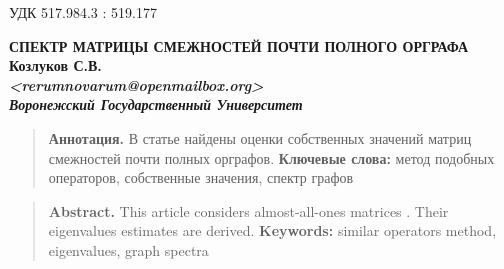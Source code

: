 \documentclass{article}
\begin{document}
\setcounter{thm}{0}
\quad УДК 517.984.3 : 519.177

\begin{center}
\vskip0.5cm
\textbf{СПЕКТР МАТРИЦЫ СМЕЖНОСТЕЙ ПОЧТИ ПОЛНОГО ОРГРАФА}\\
\vskip0.5cm
\textbf{
    \textbf{Козлуков С.В.\footnotemark} \\
    \textit{<rerumnovarum@openmailbox.org>} \\
    \textit{Воронежский Государственный Университет}
}
\end{center}


\begin{quote}
    \small{{\bf Аннотация.}
    В статье найдены оценки собственных значений
    матриц смежностей почти полных орграфов.
    }
    \textbf{Ключевые слова:}
    \small{метод подобных операторов, собственные значения, спектр графов}
\end{quote}

\begin{quote}
    \small{{\bf Abstract.}
    This article considers almost-all-ones matrices
.%
    Their eigenvalues estimates are derived.
    }
    \textbf{Keywords:}
    \small{similar operators method, eigenvalues, graph spectra}
\end{quote}



\end{document}
